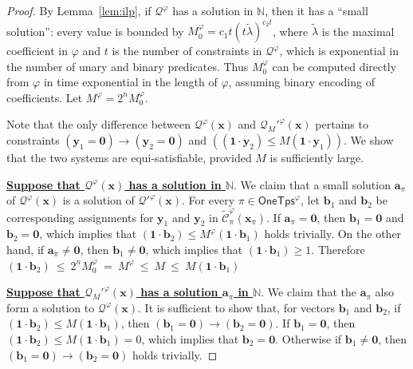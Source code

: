 \documentclass[10pt,a4paper]{article}
\theoremstyle{definition}
\theoremstyle{remark}
\newcommand{\cCtilde}{\tilde{\mathcal{C}}}
\newcommand{\cQ}{\mathcal{Q}}
\newcommand{\bbN}{\mathbb{N}}
\newcommand{\bfa}{\mathbf{a}}
\newcommand{\bfb}{\mathbf{b}}
\newcommand{\bfx}{\mathbf{x}}
\newcommand{\bfy}{\mathbf{y}}
\newcommand{\bfzero}{\mathbf{0}}
\newcommand{\bfone}{\mathbf{1}}
\newcommand{\Onetypes}{\mathsf{OneTps}}
\newcommand{\maxlambda} {\widetilde{\lambda}}
\begin{document}
\begin{proof}
    By Lemma~\ref{lem:ilp},
    if $\cQ^\varphi$ has a solution in $\bbN$,
    then it has a ``small solution'': every value is bounded by $M_0^\varphi = c_1t\left(t\maxlambda\right)^{c_2t}$,
    where $\maxlambda$ is the maximal coefficient in $\varphi$ and $t$ is the number of constraints in $\cQ^\varphi$, which is exponential in the number of unary and binary predicates.
    Thus $M_0^\varphi$ can be computed directly from $\varphi$ in time exponential in the length of $\varphi$, assuming binary encoding of coefficients.
    Let $M^\varphi = 2^{n}M_0^\varphi$.

    Note that the only difference between $\cQ^\varphi(\bfx)$ and $\cQ_{M}'^\varphi(\bfx)$
    pertains to constraints
    $(\bfy_1 = \bfzero) \to (\bfy_2 = \bfzero)$ and
    $ ((\bfone \cdot \bfy_2) \le M (\bfone \cdot \bfy_1))$.
    We show that the two systems are equi-satisfiable, provided $M$ is sufficiently large.

    \textbf{\uline{Suppose that $\cQ^\varphi(\bfx)$ has a solution in $\bbN$}}.
    We claim that a small solution $\bfa_{\pi}$ of $\cQ^\varphi(\bfx)$ 
    is a solution of $\cQ'^\varphi(\bfx)$.
    For every $\pi \in \Onetypes^\varphi$, 
    let $\bfb_1$ and $\bfb_2$ be corresponding assignments for $\bfy_1$ and $\bfy_2$ in $\cCtilde^\varphi_\pi(\bfx_\pi)$.
    If $\bfa_\pi = \bfzero$, then $\bfb_1 = \bfzero$ and $\bfb_2 = \bfzero$, 
    which implies that
    $(\bfone \cdot \bfb_2) \le M^\varphi (\bfone \cdot \bfb_1)$ holds trivially.
    On the other hand, if $\bfa_\pi \neq \bfzero$,
    then $\bfb_1 \neq \bfzero$, which implies that $(\bfone \cdot \bfb_1) \ge 1$.
    Therefore
    $(\bfone \cdot \bfb_2)
    \ \le\ 
    2^n M_0^\varphi
    \ =\ 
    M^\varphi
    \ \le\ 
    M
    \ \le\ 
    M (\bfone \cdot \bfb_1)$

    \textbf{\uline{Suppose that $\cQ_M'^\varphi(\bfx)$ has a solution $\bfa_{\pi}$ in $\bbN$}}.
    We claim that  the $\bfa_{\pi}$ also form a solution to $\cQ^\varphi(\bfx)$.
    It is sufficient to show that,
    for  vectors $\bfb_1$ and $\bfb_2$,
    if $(\bfone \cdot \bfb_2) \le M (\bfone \cdot \bfb_1)$,
    then $(\bfb_1 = \bfzero) \to (\bfb_2 = \bfzero)$.
    If $\bfb_1 = \bfzero$, then $(\bfone \cdot \bfb_2) \le M (\bfone \cdot \bfb_1) = 0$,
    which implies that $\bfb_2 = \bfzero$.
    Otherwise if $\bfb_1 \neq \bfzero$, 
    then $(\bfb_1 = \bfzero) \to (\bfb_2 = \bfzero)$ holds trivially.
\end{proof}
\end{document}
